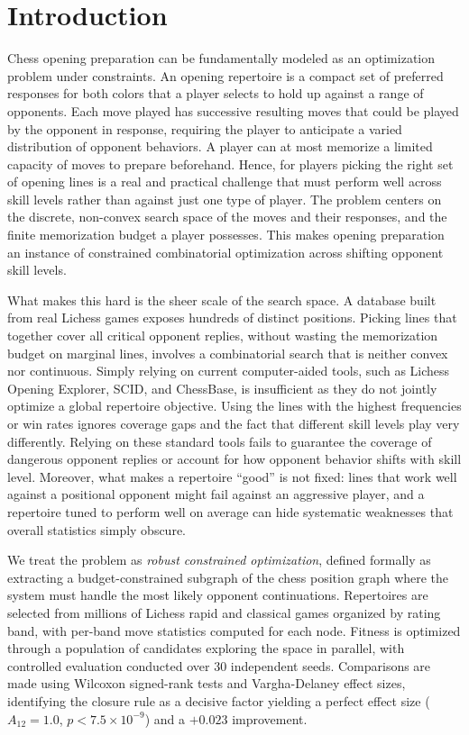 \documentclass[conference]{IEEEtran}
\begin{document}
\section{Introduction}

Chess opening preparation can be fundamentally modeled as an optimization
    problem under constraints. An opening repertoire is a compact set of
    preferred responses for both colors that a player selects to hold up against
    a range of opponents. Each move played has successive resulting moves that
    could be played by the opponent in response, requiring the player to
    anticipate a varied distribution of opponent behaviors. A player can at most
    memorize a limited capacity of moves to prepare beforehand. Hence, for players
    picking the right set of opening lines is a real and practical challenge
    that must perform well across skill levels rather than against just one type
    of player. The problem centers on the discrete, non-convex search space of
    the moves and their responses, and the finite memorization budget a player
    possesses. This makes opening preparation an instance of constrained
    combinatorial optimization across shifting opponent skill levels.

    What makes this hard is the sheer scale of the search space. A database
    built from real Lichess games exposes hundreds of distinct positions.
    Picking lines that together cover all critical opponent replies, without
    wasting the memorization budget on marginal lines, involves a combinatorial
    search that is neither convex nor continuous. Simply relying on current
    computer-aided tools, such as Lichess Opening Explorer, SCID, and ChessBase,
    is insufficient as they do not jointly optimize a global repertoire objective.
    Using the lines with the highest frequencies or win rates ignores coverage
    gaps and the fact that different skill levels play very differently. Relying
    on these standard tools fails to guarantee the coverage of dangerous
    opponent replies or account for how opponent behavior shifts with skill
    level. Moreover, what makes a repertoire ``good'' is not fixed: lines that
    work well against a positional opponent might fail against an aggressive
    player, and a repertoire tuned to perform well on average can hide systematic
    weaknesses that overall statistics simply obscure.

    We treat the problem as \emph{robust constrained optimization}, defined
    formally as extracting a budget-constrained subgraph of the chess position
    graph where the system must handle the most likely opponent continuations.
    Repertoires are selected from millions of Lichess rapid and classical games
    organized by rating band, with per-band move statistics computed for each
    node. Fitness is optimized through a population of candidates exploring the
    space in parallel, with controlled evaluation conducted over 30 independent
    seeds. Comparisons are made using Wilcoxon
    signed-rank tests and Vargha-Delaney effect sizes, identifying the closure
    rule as a decisive factor yielding a perfect effect size ($A_{12} = 1.0$,
    $p < 7.5 \times 10^{-9}$) and a $+0.023$ improvement.
\end{document}
